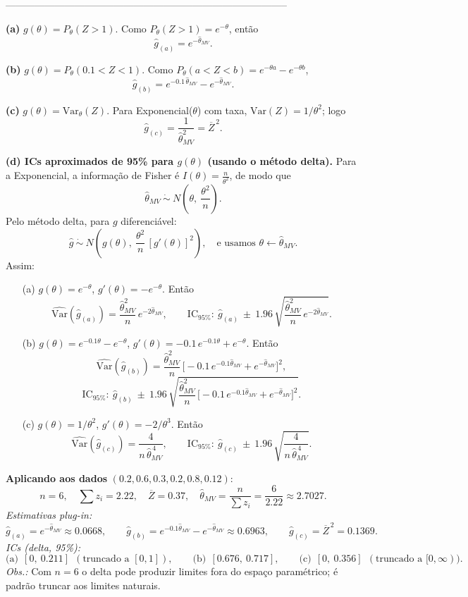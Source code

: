 --------------------------------------------------------------------------------------

\bigskip
\textbf{(a) } $g(\theta)=P_\theta(Z>1)$.
Como $P_\theta(Z>1)=e^{-\theta}$, então
\[
\widehat g_{(a)}=e^{-\widehat\theta_{MV}}.
\]

\medskip
\textbf{(b) } $g(\theta)=P_\theta(0.1<Z<1)$.
Como $P_\theta(a<Z<b)=e^{-\theta a}-e^{-\theta b}$,
\[
\widehat g_{(b)}=e^{-0.1\,\widehat\theta_{MV}}-e^{-\widehat\theta_{MV}}.
\]

\medskip
\textbf{(c) } $g(\theta)=\mathrm{Var}_\theta(Z)$.
Para Exponencial($\theta$) com taxa, $\mathrm{Var}(Z)=1/\theta^2$; logo
\[
\widehat g_{(c)}=\frac{1}{\widehat\theta_{MV}^2}=\overline Z^{\,2}.
\]

\bigskip
\textbf{(d) ICs aproximados de 95\% para $g(\theta)$ (usando o método delta).}
Para a Exponencial, a informação de Fisher é $I(\theta)=\tfrac{n}{\theta^2}$,
de modo que
\[
\widehat\theta_{MV}\ \dot\sim\ N\!\left(\theta,\ \frac{\theta^2}{n}\right).
\]
Pelo método delta, para $g$ diferenciável:
\[
\widehat g\ \dot\sim\ N\!\left(g(\theta),\ \frac{\theta^2}{n}\,[g'(\theta)]^2\right),
\quad\text{e usamos } \theta\leftarrow\widehat\theta_{MV}.
\]
Assim:

\smallskip
\begin{itemize}
\item[(a)] $g(\theta)=e^{-\theta}$, $g'(\theta)=-e^{-\theta}$. Então
\[
\widehat{\mathrm{Var}}(\widehat g_{(a)})
=\frac{\widehat\theta_{MV}^2}{n}\,e^{-2\widehat\theta_{MV}},
\qquad
\text{IC}_{95\%}:\ \widehat g_{(a)}\ \pm\ 1.96\,
\sqrt{\frac{\widehat\theta_{MV}^2}{n}\,e^{-2\widehat\theta_{MV}}}.
\]
\item[(b)] $g(\theta)=e^{-0.1\theta}-e^{-\theta}$,
\(
g'(\theta)=-0.1\,e^{-0.1\theta}+e^{-\theta}.
\)
Então
\[
\widehat{\mathrm{Var}}(\widehat g_{(b)})
=\frac{\widehat\theta_{MV}^2}{n}\,\bigl[-0.1\,e^{-0.1\widehat\theta_{MV}}+e^{-\widehat\theta_{MV}}\bigr]^2,
\]
\[
\text{IC}_{95\%}:\ \widehat g_{(b)}\ \pm\ 1.96\,
\sqrt{\frac{\widehat\theta_{MV}^2}{n}\,\bigl[-0.1\,e^{-0.1\widehat\theta_{MV}}+e^{-\widehat\theta_{MV}}\bigr]^2}.
\]
\item[(c)] $g(\theta)=1/\theta^2$, $g'(\theta)=-2/\theta^3$. Então
\[
\widehat{\mathrm{Var}}(\widehat g_{(c)})
=\frac{4}{n\,\widehat\theta_{MV}^{\,4}},
\qquad
\text{IC}_{95\%}:\ \widehat g_{(c)}\ \pm\ 1.96\,\sqrt{\frac{4}{n\,\widehat\theta_{MV}^{\,4}}}.
\]
\end{itemize}

\medskip
\textbf{Aplicando aos dados} $(0.2,0.6,0.3,0.2,0.8,0.12)$:
\[
n=6,\quad \textstyle\sum z_i=2.22,\quad \overline Z=0.37,\quad
\widehat\theta_{MV}=\frac{n}{\sum z_i}=\frac{6}{2.22}\approx 2.7027.
\]
\emph{Estimativas plug-in:}
\[
\widehat g_{(a)}=e^{-\widehat\theta_{MV}}\approx 0.0668,\qquad
\widehat g_{(b)}=e^{-0.1\widehat\theta_{MV}}-e^{-\widehat\theta_{MV}}\approx 0.6963,\qquad
\widehat g_{(c)}=\overline Z^{\,2}=0.1369.
\]
\emph{ICs (delta, 95\%):}
\[
\text{(a)}\ \ [0,\ 0.211]\ \ (\text{truncado a }[0,1]),
\qquad
\text{(b)}\ \ [0.676,\ 0.717],
\qquad
\text{(c)}\ \ [0,\ 0.356]\ \ (\text{truncado a }[0,\infty)).
\]
\textit{Obs.:} Com $n=6$ o delta pode produzir limites fora do espaço paramétrico; é
padrão truncar aos limites naturais.

